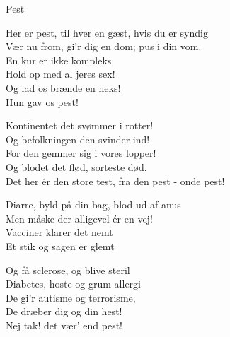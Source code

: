 \begin{song}{Pest}
  \begin{SBChorus}
    Her er pest, til hver en gæst, hvis du er syndig\\
    Vær nu from, gi'r dig en dom; pus i din vom.\\
    En kur er ikke kompleks\\
    Hold op med al jeres sex!\\
    Og lad os brænde en heks!\\
    Hun gav os pest!
  \end{SBChorus}

  \begin{SBVerse}
    Kontinentet det svømmer i rotter!\\
    Og befolkningen den svinder ind!\\
    For den gemmer sig i vores lopper!\\
    Og blodet det flød, sorteste død.\\
    Det her ér den store test, fra den pest - onde pest!
  \end{SBVerse}

  \begin{SBChorus}
    Diarre, byld på din bag, blod ud af anus\\
    Men måske der alligevel ér en vej!\\
    Vacciner klarer det nemt\\
    Et stik og sagen er glemt
  \end{SBChorus}

  \begin{SBSection*}
    Og få sclerose, og blive steril\\
    Diabetes, hoste og grum allergi\\
    De gi'r autisme og terrorisme,\\
    De dræber dig og din hest!\\
    Nej tak! det vær' end pest!
  \end{SBSection*}
\end{song}